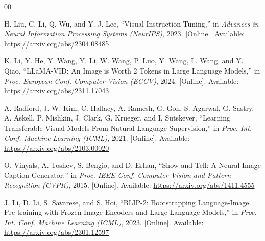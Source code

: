 \documentclass[conference]{IEEEtran}
\begin{document}
\begin{thebibliography}{00}

H. Liu, C. Li, Q. Wu, and Y. J. Lee, ``Visual Instruction Tuning,'' in \textit{Advances in Neural Information Processing Systems (NeurIPS)}, 2023. [Online]. Available: \url{https://arxiv.org/abs/2304.08485}

K. Li, Y. He, Y. Wang, Y. Li, W. Wang, P. Luo, Y. Wang, L. Wang, and Y. Qiao, ``LLaMA-VID: An Image is Worth 2 Tokens in Large Language Models,'' in \textit{Proc. European Conf. Computer Vision (ECCV)}, 2024. [Online]. Available: \url{https://arxiv.org/abs/2311.17043}

A. Radford, J. W. Kim, C. Hallacy, A. Ramesh, G. Goh, S. Agarwal, G. Sastry, A. Askell, P. Mishkin, J. Clark, G. Krueger, and I. Sutskever, ``Learning Transferable Visual Models From Natural Language Supervision,'' in \textit{Proc. Int. Conf. Machine Learning (ICML)}, 2021. [Online]. Available: \url{https://arxiv.org/abs/2103.00020}

O. Vinyals, A. Toshev, S. Bengio, and D. Erhan, ``Show and Tell: A Neural Image Caption Generator,'' in \textit{Proc. IEEE Conf. Computer Vision and Pattern Recognition (CVPR)}, 2015. [Online]. Available: \url{https://arxiv.org/abs/1411.4555}

J. Li, D. Li, S. Savarese, and S. Hoi, ``BLIP-2: Bootstrapping Language-Image Pre-training with Frozen Image Encoders and Large Language Models,'' in \textit{Proc. Int. Conf. Machine Learning (ICML)}, 2023. [Online]. Available: \url{https://arxiv.org/abs/2301.12597}

\end{thebibliography}
\end{document}
